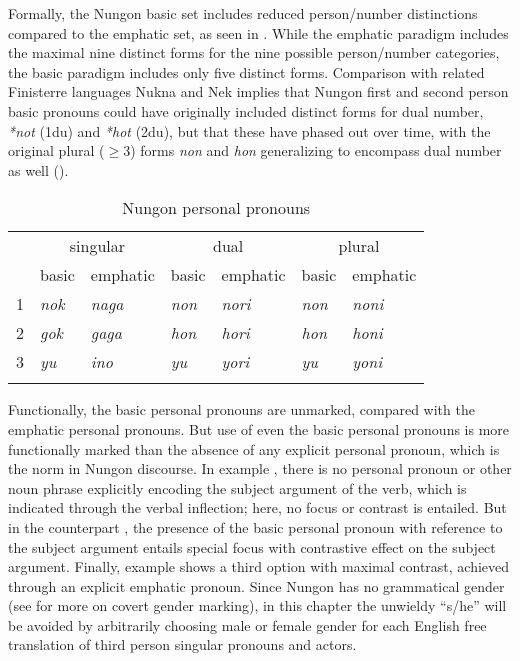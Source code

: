 \documentclass[output=paper,colorlinks,citecolor=brown]{langscibook}
\begin{document}
Formally, the Nungon basic set includes reduced person/number distinctions compared to the emphatic set, as seen in . While the emphatic paradigm includes the maximal nine distinct forms for the nine possible person/number categories, the basic paradigm includes only five distinct forms. Comparison with related Finisterre languages Nukna and Nek implies that Nungon first and second person basic pronouns could have originally included distinct forms for dual number, \textit{*not} (1du) and \textit{*hot} (2du), but that these have phased out over time, with the original plural (${\geq}$3) forms \textit{non} and \textit{hon} generalizing to encompass dual number as well (\citealt{Sarvasy2017Grammar, Sarvasy2018Multiple}). 

\begin{table}[]
    \centering
    \begin{tabularx}{\textwidth}{XXXXXXX} 
    \lsptoprule
    & \multicolumn{2}{c}{ singular} & \multicolumn{2}{c}{ dual} & \multicolumn{2}{c}{ plural}\\
    & basic & emphatic & basic & emphatic & basic & emphatic\\
    \hline
    1 & \textit{nok} & \textit{naga} & \textit{non} & \textit{nori} & \textit{non} & \textit{noni}\\
    2 & \textit{gok} & \textit{gaga} & \textit{hon} & \textit{hori} & \textit{hon} & \textit{honi}\\
    3 & \textit{yu} & \textit{ino} & \textit{yu} & \textit{yori} & \textit{yu} & \textit{yoni}\\
    \lspbottomrule
    \end{tabularx}
    \caption{Nungon personal pronouns}
    \label{tab:sarvasy:1}
\end{table}

Functionally, the basic personal pronouns are unmarked, compared with the emphatic personal pronouns. But use of even the basic personal pronouns is more functionally marked than the absence of any explicit personal pronoun, which is the norm in Nungon discourse. In example , there is no personal pronoun or other noun phrase explicitly encoding the subject argument of the verb, which is indicated through the verbal inflection; here, no focus or contrast is entailed. But in the counterpart , the presence of the basic personal pronoun with reference to the subject argument entails special focus with contrastive effect on the subject argument. Finally, example  shows a third option with maximal contrast, achieved through an explicit emphatic pronoun. Since Nungon has no grammatical gender (see \citealt{Sarvasy2016Gender} for more on covert gender marking), in this chapter the unwieldy “s/he” will be avoided by arbitrarily choosing male or female gender for each English free translation of third person singular pronouns and actors.
\end{document}
